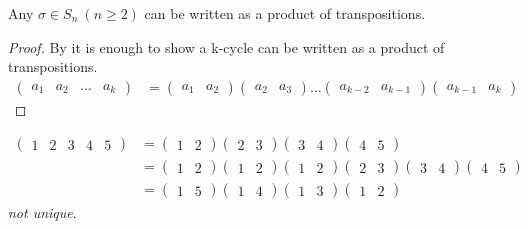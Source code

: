 \begin{proposition}
Any \(\sigma \in S_n \ (n \geq 2)\) can be written as a product of transpositions.
\end{proposition}

\begin{proof}
By  it is enough to show a k-cycle can be written as a product of transpositions.
\begin{align*}
    \begin{pmatrix}a_1 & a_2 & \ldots & a_k \end{pmatrix}
    &= \begin{pmatrix}a_1 & a_2\end{pmatrix} \begin{pmatrix}a_2 & a_3\end{pmatrix} \ldots \begin{pmatrix}a_{k-2} & a_{k-1}\end{pmatrix} \begin{pmatrix}a_{k-1} & a_k\end{pmatrix}
\end{align*}
\end{proof}

\begin{example}
\begin{align*}
    \begin{pmatrix}1 & 2 & 3 & 4 & 5\end{pmatrix} &= \begin{pmatrix}1 & 2\end{pmatrix} \begin{pmatrix}2 & 3\end{pmatrix} \begin{pmatrix}3 & 4\end{pmatrix} \begin{pmatrix}4 & 5\end{pmatrix} \\
    &= \begin{pmatrix}1 & 2\end{pmatrix} \begin{pmatrix}1 & 2\end{pmatrix} \begin{pmatrix}1 & 2\end{pmatrix} \begin{pmatrix}2 & 3\end{pmatrix} \begin{pmatrix}3 & 4\end{pmatrix} \begin{pmatrix}4 & 5\end{pmatrix} \\
    &= \begin{pmatrix}1 & 5\end{pmatrix} \begin{pmatrix}1 & 4\end{pmatrix} \begin{pmatrix}1 & 3\end{pmatrix} \begin{pmatrix}1 & 2\end{pmatrix}
\end{align*}
\emph{not unique}.
\end{example}

